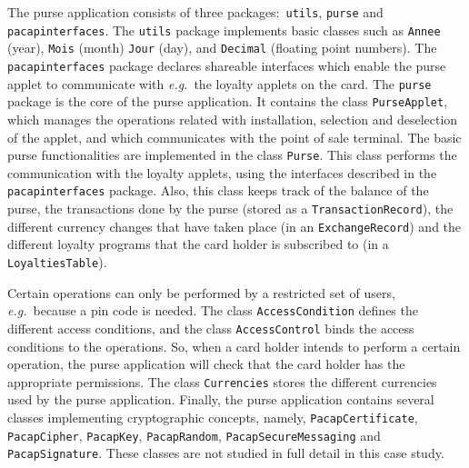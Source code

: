 \documentclass[a4paper]{llncs}
\begin{document}
The purse application consists of three packages$:$ \texttt{utils},
\texttt{purse} and \texttt{pacap\-interfaces}. The {\tt utils} package
implements basic classes such as \texttt{Annee} (year), 
\texttt{Mois} (month) \texttt{Jour} (day), and \texttt{Decimal}
(floating point numbers).  The \texttt{pacap\-interfaces} package
declares shareable interfaces which enable the purse applet to
communicate with \emph{e.g.}~the loyalty applets on the card.  The
\texttt{purse} package is the core of the purse application.  It
contains the class
\texttt{PurseApplet}, which manages the operations related with 
installation, selection and deselection of the applet, and which
communicates with the point of sale terminal.  The basic purse
functionalities are implemented in the class
\texttt{Purse}. This class performs the communication
with the loyalty applets, using the interfaces described in the
\texttt{pacapinterfaces} package.  Also, this class keeps track of the 
balance of the purse, the transactions done by the purse (stored as a
\texttt{TransactionRecord}), the different currency changes that have
taken place (in an \texttt{ExchangeRecord}) and the different
loyalty programs that the card holder is subscribed to (in a
\texttt{LoyaltiesTable}). 


Certain operations can only be performed by a restricted set of users,
\emph{e.g.}~because a pin code is needed.
The class \texttt{AccessCondition} defines the different access
conditions, and the class \texttt{AccessControl} binds the access conditions
to the operations. So, when a card holder intends to perform a certain
operation, the purse application will check that the card holder has
the appropriate permissions. %
The class \texttt{Currencies} stores the different currencies used by
the purse application.  Finally, the purse application contains several classes
implementing cryptographic concepts, namely, \texttt{PacapCertificate},
\texttt{PacapCipher}, \texttt{PacapKey}, \texttt{PacapRandom},
\texttt{PacapSecureMessaging} and \texttt{PacapSignature}. These
classes are not studied in full detail in this case study.
\end{document}
